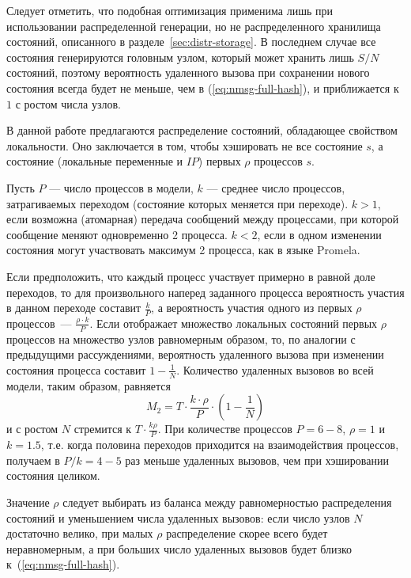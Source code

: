 Следует отметить, что подобная оптимизация применима лишь при использовании распределенной
генерации, но не распределенного хранилища состояний, описанного в
разделе~\ref{sec:distr-storage}. В последнем случае все состояния генерируются головным
узлом, который может хранить лишь $S/N$ состояний, поэтому вероятность удаленного вызова
при сохранении нового состояния всегда будет не меньше, чем в (\ref{eq:nmsg-full-hash}), и
приближается к $1$ с ростом числа узлов.

В данной работе предлагаются распределение состояний, обладающее свойством
локальности. Оно заключается в том, чтобы хэшировать не все состояние $s$, а состояние
(локальные переменные и $IP$) первых $\rho$ процессов $s$.

Пусть $P$ — число процессов в модели, $k$ — среднее число процессов, затрагиваемых
переходом (состояние которых меняется при переходе). $k > 1$, если возможна (атомарная)
передача сообщений между процессами, при которой сообщение меняют одновременно 2
процесса. $k < 2$, если в одном изменении состояния могут участвовать максимум 2 процесса,
как в языке Promela.

Если предположить, что каждый процесс участвует примерно в равной доле переходов, то для
произвольного наперед заданного процесса вероятность участия в данном переходе составит
$\frac{k}{P}$, а вероятность участия одного из первых $\rho$ процессов~--- $\frac{\rho\cdot
  k}{P}$. Если  отображает множество локальных состояний первых $\rho$
процессов на множество узлов равномерным образом, то, по аналогии с предыдущими
рассуждениями, вероятность удаленного вызова при изменении состояния процесса составит $1
- \frac{1}{N}$. Количество удаленных вызовов во всей модели, таким образом, равняется
\begin{equation}
  \label{eq:nmsg-firstproc-hash}
  M_2 = T \cdot \frac{k\cdot\rho}{P} \cdot (1 - \frac{1}{N})
\end{equation}
и с ростом $N$ стремится к $T \cdot \frac{k\rho}{P}$. При количестве процессов $P = 6-8$,
$\rho = 1$ и $k = 1.5$, т.е. когда половина переходов приходится на взаимодействия
процессов, получаем в $P/k = 4-5$ раз меньше удаленных вызовов, чем при хэшировании
состояния целиком.

Значение $\rho$ следует выбирать из баланса между равномерностью распределения состояний и
уменьшением числа удаленных вызовов: если число узлов $N$ достаточно велико, при малых
$\rho$ распределение скорее всего будет неравномерным, а при больших число удаленных
вызовов будет близко к~(\ref{eq:nmsg-full-hash}).

